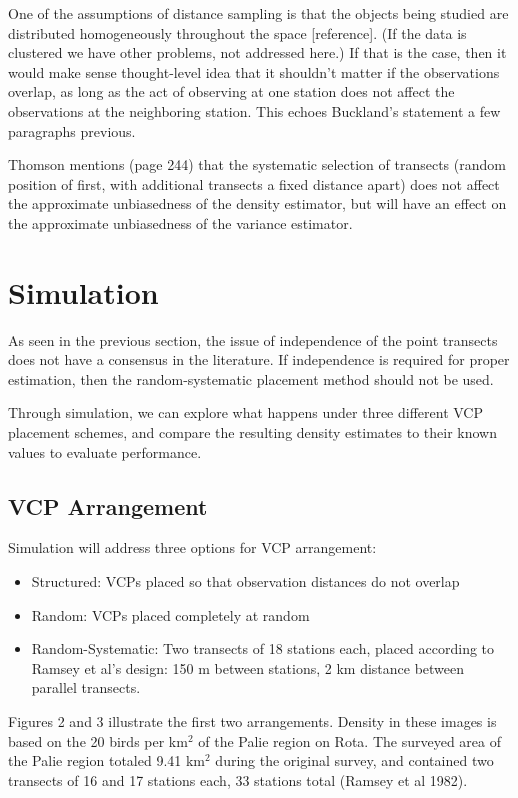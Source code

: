 \documentclass[12pt]{article}
\begin{document}
One of the assumptions of distance sampling is that the objects being studied are distributed homogeneously throughout the space [reference].  (If the data is clustered we have other problems, not addressed here.) If that is the case, then it would make sense thought-level idea that it shouldn't matter if the observations overlap, as long as the act of observing at one station does not affect the observations at the neighboring station. This echoes Buckland’s statement a few paragraphs previous.

Thomson mentions (page 244) that the systematic selection of transects (random position of first, with additional transects a fixed distance apart) does not affect the approximate unbiasedness of the density estimator, but will have an effect on the approximate unbiasedness of the variance estimator. 

\section{Simulation}
As seen in the previous section, the issue of independence of the point transects does not have a consensus in the literature. If independence is required for proper estimation, then the random-systematic placement method should not be used. 

Through simulation, we can explore what happens under three different VCP placement schemes, and compare the resulting density estimates to their known values to evaluate performance.

\subsection{VCP Arrangement}
Simulation will address three options for VCP arrangement:
\begin{itemize}
\item Structured: VCPs placed so that observation distances do not overlap
\item Random: VCPs placed completely at random
\item Random-Systematic: Two transects of 18 stations each, placed according to Ramsey et al's design: 150 m between stations, 2 km distance between parallel transects.
\end{itemize}

Figures 2 and 3 illustrate the first two arrangements. Density in these images is based on the 20 birds per km$^2$ of the Palie region on Rota. The surveyed area of the Palie region totaled 9.41 km$^2$ during the original survey, and contained two transects of 16 and 17 stations each, 33 stations total (Ramsey et al 1982).
\end{document}
